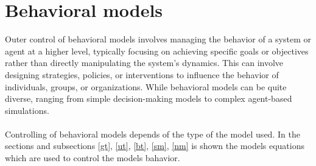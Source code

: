 \documentclass[12pt]{report}
\begin{document}
\section{Behavioral models}

Outer control of behavioral models involves managing the behavior of a system or agent
at a higher level, typically focusing on achieving specific goals or objectives rather
than directly manipulating the system's dynamics. This can involve designing strategies,
policies, or interventions to influence the behavior of individuals, groups, or organizations.
While behavioral models can be quite diverse, ranging from simple decision-making models to
complex agent-based simulations.\\
\\
Controlling of behavioral models depends of the type of the model used. In the sections and subsections
\ref{gt}, \ref{ut}, \ref{bt}, \ref{sm}, \ref{nm} is shown the models equations which are
used to control the models bahavior.

\printbibliography
\end{document}

